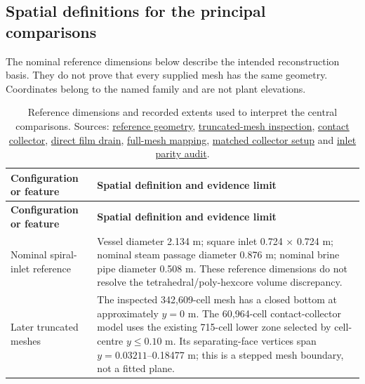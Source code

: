 \subsection{Spatial definitions for the principal comparisons}

The nominal reference dimensions below describe the intended reconstruction basis. They do not prove that every supplied mesh has the same geometry. Coordinates belong to the named family and are not plant elevations.

\begin{longtable}{@{}>{\raggedright\arraybackslash}p{0.29000000\dimexpr\linewidth-2\tabcolsep\relax}>{\raggedright\arraybackslash}p{0.71000000\dimexpr\linewidth-2\tabcolsep\relax}@{}}
\caption{Reference dimensions and recorded extents used to interpret the central comparisons. Sources: \href{../../../../technical/purnanto-spiral-inlet-geometry.md}{reference geometry}, \href{../../../../experiments/phase-07a-simplified-purnanto-liquid-removal/mesh-inspection.md}{truncated-mesh inspection}, \href{../../../../experiments/phase-07-2a-wall-liquid-routing/stage-02-combined-ewf-roughness/ewf-absorber/setup.md}{contact collector}, \href{../../../../experiments/phase-07-2a-wall-liquid-routing/stage-04-ewf-wall-parameters/ewf-only-drain/setup.md}{direct film drain}, \href{../../../../experiments/phase-07b-full-geometry-liquid-removal/geometry-proof.md}{full-mesh mapping}, \href{../../../../experiments/phase-07b-full-geometry-liquid-removal/convergence-investigation/coupled-nphase-weaker-sink/setup.md}{matched collector setup} and \href{../../../../experiments/phase-08-storyline-reconstruction/stage-01-60k-storyline/baseline-lineage-audit.md}{inlet parity audit}.}\label{tab:table-D.2}\\
\toprule
\textbf{Configuration or feature} & \textbf{Spatial definition and evidence limit} \\
\midrule
\endfirsthead
\toprule
\textbf{Configuration or feature} & \textbf{Spatial definition and evidence limit} \\
\midrule
\endhead
Nominal spiral-inlet reference & Vessel diameter 2.134 m; square inlet 0.724 × 0.724 m; nominal steam passage diameter 0.876 m; nominal brine pipe diameter 0.508 m. These reference dimensions do not resolve the tetrahedral/poly-hexcore volume discrepancy. \\
Later truncated meshes & The inspected 342,609-cell mesh has a closed bottom at approximately \(y=0\) m. The 60,964-cell contact-collector model uses the existing 715-cell lower zone selected by cell-centre \(y\leq0.10\) m. Its separating-face vertices span \(y=0.03211\)--0.18477 m; this is a stepped mesh boundary, not a fitted plane. \\

\end{longtable}

